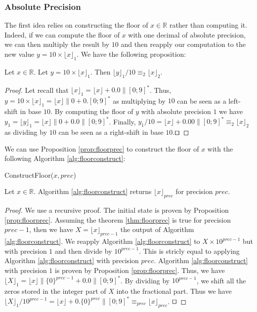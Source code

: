 \documentclass[runningheads]{llncs}
\begin{document}
\subsubsection{Absolute Precision} 
The first idea relies on constructing the floor of $x\in\mathbb{R}$ rather than computing it. Indeed, if we can compute the floor of $x$ with one decimal of absolute precision, we can then multiply the result by $10$ and then reapply our computation to the new value $y=10\times \lfloor x\rfloor_1$. We have the following proposition:
\begin{proposition}\label{prop:floorprec}
  Let $x\in\mathbb{R}$. Let $y = 10\times\lfloor x\rfloor_1$. Then $\lfloor y \rfloor_1 /10 \equiv_2 \lfloor x \rfloor_2$.
\end{proposition}
\begin{proof}
  Let recall that $\lfloor x \rfloor_1 = \lfloor x \rfloor + 0.0 \|[0;9]^*$. Thus, $y=10\times\lfloor x \rfloor_1=\lfloor x\rfloor\|0+0.[0;9]^*$ as multiplying by $10$ can be seen as a left-shift in base $10$. By computing the floor of $y$ with absolute precision $1$ we have $y_1=\lfloor y \rfloor_1 = \lfloor x \rfloor\|0 + 0.0\|[0;9]^*$. Finally, $ y_1/10 = \lfloor x \rfloor + 0.00\|[0;9]^*\equiv_2 \lfloor x \rfloor_2$ as dividing by $10$ can be seen as a right-shift in base $10$.\hfill $\qed$ 
\end{proof}
We can use Proposition \ref{prop:floorprec} to construct the floor of $x$ with the following Algorithm \ref{alg:floorconstruct}:

\begin{algorithm}[H]
  \caption{ConstructFloor($x,prec$)}
  \label{alg:floorconstruct}
\end{algorithm}

\begin{theorem}\label{thm:floorprec}
  Let $x\in\mathbb{R}$. Algorithm \ref{alg:floorconstruct} returns $\lfloor x \rfloor_{prec}$ for precision $prec$.
\end{theorem}
\begin{proof}
  We use a recursive proof. The initial state is proven by Proposition \ref{prop:floorprec}. Assuming the theorem \ref{thm:floorprec} is true for precision $prec-1$, then we have $X=\lfloor x \rfloor_{prec-1}$ the output of Algorithm \ref{alg:floorconstruct}. We reapply Algorithm \ref{alg:floorconstruct} to $X\times 10^{prec-1}$ but with precision $1$ and then divide by $10^{prec-1}$. This is stricly equal to applying Algorithm \ref{alg:floorconstruct} with precision $prec$. Algorithm \ref{alg:floorconstruct} with precision $1$ is proven by Proposition \ref{prop:floorprec}. Thus, we have $\lfloor X \rfloor_1 = \lfloor x\rfloor \| \{0\}^{prec-1} + 0.0\|[0;9]^*$. By dividing by $10^{prec-1}$, we shift all the zeros stored in the integer part of $X$ into the fractional part. Thus we have $\lfloor X \rfloor_1 /10^{prec-1} = \lfloor x \rfloor + 0.\{0\}^{prec}\|[0;9]^* \equiv_{prec} \lfloor x \rfloor_{prec}$. \hfill $\qed$ 
\end{proof}
 
\end{document}
